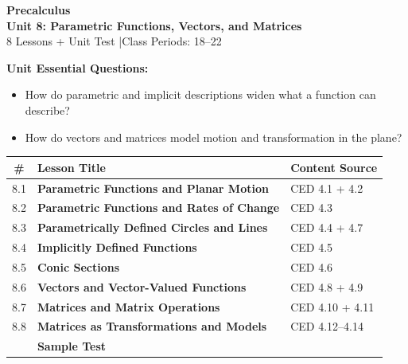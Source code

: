 \documentclass[10pt]{article}
\begin{document}
\thispagestyle{empty}

\vspace{-1.05in}

\begin{center}
  {\color{white}\textbf{\LARGE Precalculus}}\\[6pt]
  {\color{skymid}\Large\textbf{Unit 8: Parametric Functions, Vectors, and Matrices}}\\[4pt]
  {\color{white}\small 8 Lessons + Unit Test \quad|\quad Class Periods: 18--22}
\end{center}

\vspace{0.26in}

\begin{tcolorbox}[colback=goldbg, colframe=goldacc, boxrule=0.8pt, arc=2mm,
    left=3mm, right=3mm, top=2mm, bottom=2mm]
\small\textbf{Unit Essential Questions:}
\begin{itemize}[leftmargin=1.4em, itemsep=2pt, topsep=2pt]
  \item How do parametric and implicit descriptions widen what a function can describe?
  \item How do vectors and matrices model motion and transformation in the plane?
\end{itemize}
\end{tcolorbox}

\vspace{0.14in}

\begin{tocbox}
\small
\renewcommand{\arraystretch}{1.45}
\begin{tabularx}{\linewidth}{@{} c >{\bfseries}X l @{}}
\rowcolor{sky}
\textbf{\#} & \textbf{Lesson Title} & \textbf{Content Source} \\
\midrule
8.1 & Parametric Functions and Planar Motion & CED 4.1 + 4.2 \\
8.2 & Parametric Functions and Rates of Change & CED 4.3 \\
8.3 & Parametrically Defined Circles and Lines & CED 4.4 + 4.7 \\
8.4 & Implicitly Defined Functions & CED 4.5 \\
8.5 & Conic Sections & CED 4.6 \\
8.6 & Vectors and Vector-Valued Functions & CED 4.8 + 4.9 \\
8.7 & Matrices and Matrix Operations & CED 4.10 + 4.11 \\
8.8 & Matrices as Transformations and Models & CED 4.12--4.14 \\
\midrule
\rowcolor{sky}
     & \textbf{Sample Test} &      \\
\end{tabularx}
\end{tocbox}
\end{document}

